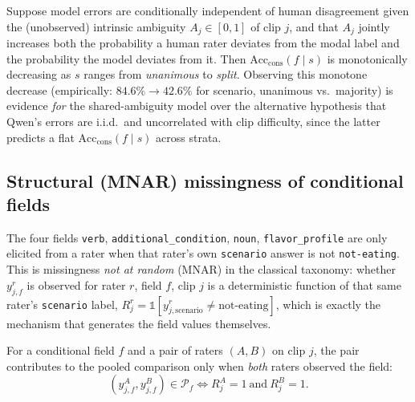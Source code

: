 \begin{proposition}
\label{prop:difficulty}
Suppose model errors are conditionally independent of human disagreement
given the (unobserved) intrinsic ambiguity $A_j\in[0,1]$ of clip $j$, and
that $A_j$ jointly increases both the probability a human rater deviates
from the modal label and the probability the model deviates from it. Then
$\mathrm{Acc}_{\mathrm{cons}}(f\mid s)$ is monotonically decreasing as $s$
ranges from \emph{unanimous} to \emph{split}. Observing this monotone
decrease (empirically: $84.6\% \to 42.6\%$ for scenario, unanimous vs.\
majority) is evidence \emph{for} the shared-ambiguity model over the
alternative hypothesis that Qwen's errors are i.i.d.\ and uncorrelated with
clip difficulty, since the latter predicts a flat
$\mathrm{Acc}_{\mathrm{cons}}(f\mid s)$ across strata.
\end{proposition}

\subsection{Structural (MNAR) missingness of conditional fields}

The four fields \texttt{verb}, \texttt{additional\_condition}, \texttt{noun},
\texttt{flavor\_profile} are only elicited from a rater when that rater's
own \texttt{scenario} answer is not \texttt{not-eating}. This is missingness
\emph{not at random} (MNAR) in the classical taxonomy: whether $y^{r}_{j,f}$
is observed for rater $r$, field $f$, clip $j$ is a deterministic function
of that same rater's \texttt{scenario} label, $R^r_{j} =
\mathbb{1}[y^r_{j,\text{scenario}} \ne \text{not-eating}]$, which is exactly
the mechanism that generates the field values themselves.

\begin{definition}
For a conditional field $f$ and a pair of raters $(A,B)$ on clip $j$, the
pair contributes to the pooled comparison only when \emph{both} raters
observed the field:
\[
  (y^A_{j,f}, y^B_{j,f}) \in \mathcal{P}_f
  \iff R^A_j = 1 \ \text{and}\ R^B_j = 1 .
\]
\end{definition}

